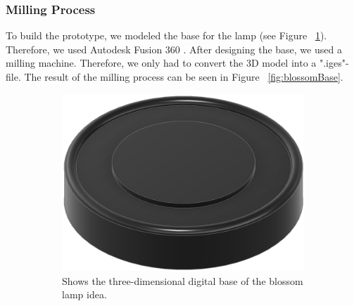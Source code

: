 \documentclass[04.3_buildingProcess.tex]{subfiles}
\begin{document}
    \subsubsection{Milling Process}

    \begin{flushleft}
        To build the prototype, we modeled the base for the lamp (see Figure ~\ref{fig:blossomBaseModel}). 
        Therefore, we used Autodesk Fusion 360 \cite{autodeskFusion360}. After designing the base, we used a 
        milling machine. Therefore, we only had to convert the 3D model into a ".iges"-file.
        The result of the milling process can be seen in Figure ~\ref{fig:blossomBase}.
    \end{flushleft}

    \begin{figure}[H]
        \centering
        \begin{subfigure}{.45\textwidth}
            \centering
            \includegraphics[scale=0.25]{images/materialProcess/FlowerLamp.png}
            \caption{Shows the three-dimensional digital base of the blossom lamp idea.}
            \label{fig:blossomBaseModel}
            \vspace{6mm}
        \end{subfigure}
        \hspace{1mm}
        \begin{subfigure}{.45\textwidth}
            \centering

\end{subfigure}
\end{figure}
\end{document}
